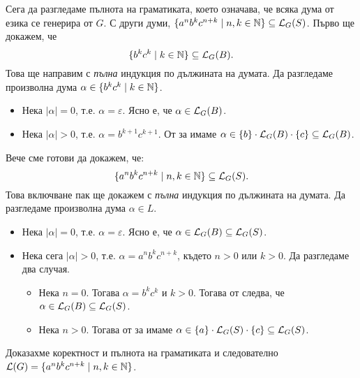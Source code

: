 \begin{extra}
\begin{example}
  Сега да разгледаме пълнота на граматиката, което означава, че
  всяка дума от езика се генерира от $G$. С други думи, $\{a^nb^kc^{n+k} \mid n,k\in\mathbb{N}\} \subseteq \mathcal{L}_G(S)$.
  Първо ще докажем, че
  \begin{equation}
    \label{eq:4}
      \{b^kc^k \mid k \in \mathbb{N}\} \subseteq \mathcal{L}_G(B).
    \end{equation}
    Това ще направим с \emph{пълна} индукция по дължината на думата.
    Да разгледаме произволна дума $\alpha \in \{b^kc^k \mid k \in \mathbb{N}\}$.
    \begin{itemize}
    \item
      Нека $|\alpha| = 0$, т.е. $\alpha = \varepsilon$.
      Ясно е, че $\alpha \in \mathcal{L}_G(B)$.
    \item
      Нека $|\alpha| > 0$, т.е. $\alpha = b^{k+1}c^{k+1}$.
      От \IndHyp за  имаме $\alpha \in \{b\} \cdot \mathcal{L}_G(B) \cdot \{c\} \subseteq \mathcal{L}_G(B)$.
    \end{itemize}
    Вече сме готови да докажем, че:
    \begin{equation}
      \label{eq:9}
      \{a^nb^kc^{n+k} \mid n,k \in \mathbb{N}\} \subseteq \mathcal{L}_G(S).
    \end{equation}
    Това включване пак ще докажем с \emph{пълна} индукция по дължината на думата.
    Да разгледаме произволна дума $\alpha \in L$. 
    \begin{itemize}
    \item
      Нека $|\alpha| = 0$, т.е. $\alpha = \varepsilon$.
      Ясно е, че $\alpha \in \mathcal{L}_G(B) \subseteq \mathcal{L}_G(S)$.
    \item
      Нека сега $|\alpha| > 0$, т.е. $\alpha = a^nb^kc^{n+k}$, където $n > 0$ или $k > 0$. Да разгледаме два случая.
      \begin{itemize}
      \item
        Нека $n = 0$. Тогава $\alpha = b^kc^k$ и $k > 0$. Тогава от 
        следва, че $\alpha \in \mathcal{L}_G(B) \subseteq \mathcal{L}_G(S)$.
      \item                   
        Нека $n > 0$. Тогава от \IndHyp за  имаме
        $\alpha \in \{a\} \cdot \mathcal{L}_G(S) \cdot \{c\} \subseteq \mathcal{L}_G(S)$.
      \end{itemize}
    \end{itemize}
    Доказахме коректност и пълнота на граматиката и следователно $\mathcal{L}(G) = \{a^nb^kc^{n+k} \mid n,k\in\mathbb{N}\}$.
  \end{example}
  

\end{extra}
